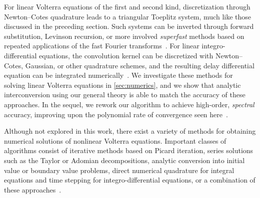 \documentclass{cams-l} %
\theoremstyle{definition}
\theoremstyle{remark}
\numberwithin{equation}{section}
\begin{document}
For linear Volterra equations of the first and second kind, discretization through Newton--Cotes quadrature leads to a triangular Toeplitz system, much like those discussed in the preceding section. Such systems can be inverted through forward substitution, Levinson recursion, or more involved \textit{superfast} methods based on repeated applications of the fast Fourier transforms~\cite{commenges1984fast, chandrasekaran2008superfast, LIN2004511}. For linear integro-differential equations, the convolution kernel can be discretized with Newton--Cotes, Gaussian, or other quadrature schemes, and the resulting delay differential equation can be integrated numerically~\cite{ansmann2018efficiently}. We investigate these methods for solving linear Volterra equations in \cref{sec:numerics}, and we show that analytic interconversion using our general theory is able to match the accuracy of these approaches. In the sequel, we rework our algorithm to achieve high-order, \emph{spectral} accuracy, improving upon the polynomial rate of convergence seen here~\cite{sieve}.

Although not explored in this work, there exist a variety of methods for obtaining numerical solutions of nonlinear Volterra equations. Important classes of algorithms consist of iterative methods based on Picard iteration, series solutions such as the Taylor or Adomian decompositions, analytic conversion into initial value or boundary value problems, direct numerical quadrature for integral equations and time stepping for integro-differential equations, or a combination of these approaches~\cite{linz1985analytical, wazwaz2011linear}.
\end{document}
